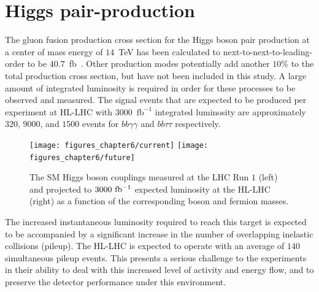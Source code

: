 

\providecommand{\phasezero}{Phase-0}
\providecommand{\phaseone}{Phase-I}
\providecommand{\phasetwo}{Phase-II}

\chapter{Higgs pair-production}

The gluon fusion production cross section for the Higgs boson pair production at a center of mass energy of $14$~TeV has been calculated to next-to-next-to-leading-order to be $40.7$~fb~\cite{Dawson:1998py,Grigo:2014jma}. Other production modes potentially add another $10\%$ to the total production cross section, but have not been included in this study. A large amount of integrated luminosity is required in order for these processes to be observed and measured. The signal events that are expected to be produced per experiment at HL-LHC with $3000$~$\mathrm{fb}^{-1}$ integrated luminosity are approximately $320$, $9000$, and $1500$ events for $bb\gamma\gamma$ and $bb\tau\tau$ respectively.


\begin{figure}[hbtp]
  \begin{center}
    \texttt{[image: figures\_chapter6/current]}
    \texttt{[image: figures\_chapter6/future]}       
    \caption{The SM Higgs boson couplings measured at the LHC Run $1$ (left) and projected to $3000~\mathrm{fb^{-1}}$ expected luminosity at the HL-LHC (right) as a function of the corresponding boson and fermion masses.}
    \label{fig:feynman}
  \end{center}
\end{figure}

The increased instantaneous luminosity required to reach this target is expected to be accompanied by a significant increase in the number of overlapping inelastic collisions (pileup). The HL-LHC is expected to operate with an average of $140$ simultaneous pileup events. This presents a serious challenge to the experiments in their ability to deal with this increased level of activity and energy flow, and to preserve the detector performance under this environment. 

